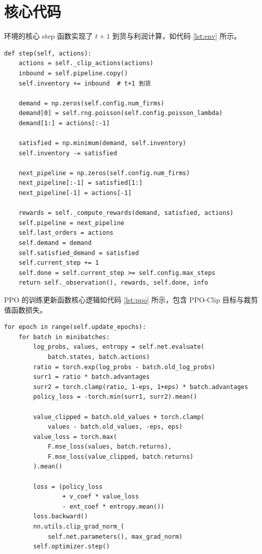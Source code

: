 \documentclass[nohyperref]{article}
\begin{document}
\section{核心代码}
\label{sec:code}

环境的核心 step 函数实现了 $t+1$ 到货与利润计算，如代码 \ref{lst:env} 所示。

\begin{lstlisting}[caption={环境 step 函数核心逻辑}, label={lst:env}]
def step(self, actions):
    actions = self._clip_actions(actions)
    inbound = self.pipeline.copy()
    self.inventory += inbound  # t+1 到货

    demand = np.zeros(self.config.num_firms)
    demand[0] = self.rng.poisson(self.config.poisson_lambda)
    demand[1:] = actions[:-1]

    satisfied = np.minimum(demand, self.inventory)
    self.inventory -= satisfied

    next_pipeline = np.zeros(self.config.num_firms)
    next_pipeline[:-1] = satisfied[1:]
    next_pipeline[-1] = actions[-1]

    rewards = self._compute_rewards(demand, satisfied, actions)
    self.pipeline = next_pipeline
    self.last_orders = actions
    self.demand = demand
    self.satisfied_demand = satisfied
    self.current_step += 1
    self.done = self.current_step >= self.config.max_steps
    return self._observation(), rewards, self.done, info
\end{lstlisting}

PPO 的训练更新函数核心逻辑如代码 \ref{lst:ppo} 所示，包含 PPO-Clip 目标与裁剪值函数损失。

\begin{lstlisting}[caption={PPO 更新核心逻辑}, label={lst:ppo}]
for epoch in range(self.update_epochs):
    for batch in minibatches:
        log_probs, values, entropy = self.net.evaluate(
            batch.states, batch.actions)
        ratio = torch.exp(log_probs - batch.old_log_probs)
        surr1 = ratio * batch.advantages
        surr2 = torch.clamp(ratio, 1-eps, 1+eps) * batch.advantages
        policy_loss = -torch.min(surr1, surr2).mean()

        value_clipped = batch.old_values + torch.clamp(
            values - batch.old_values, -eps, eps)
        value_loss = torch.max(
            F.mse_loss(values, batch.returns),
            F.mse_loss(value_clipped, batch.returns)
        ).mean()

        loss = (policy_loss
                + v_coef * value_loss
                - ent_coef * entropy.mean())
        loss.backward()
        nn.utils.clip_grad_norm_(
            self.net.parameters(), max_grad_norm)
        self.optimizer.step()
\end{lstlisting}
\end{document}
